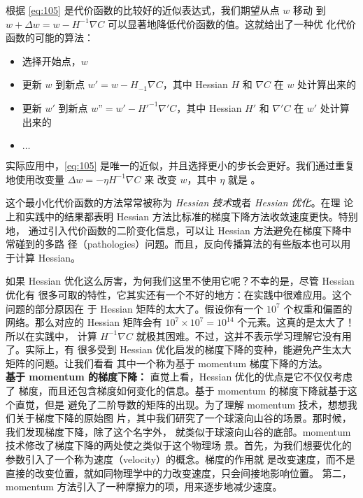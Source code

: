 根据 \eqref{eq:105} 是代价函数的比较好的近似表达式，我们期望从点 $w$ 移动
到 $w+\Delta w = w - H^{-1}\nabla C$ 可以显著地降低代价函数的值。这就给出了一种优
化代价函数的可能的算法：
\begin{itemize}
\item 选择开始点，$w$
\item 更新 $w$ 到新点 $w' = w - H_{-1}\nabla C$，其中 Hessian $H$ 和 $\nabla C$
  在 $w$ 处计算出来的
\item 更新 $w'$ 到新点 $w” = w' - H'^{-1}\nabla' C$，其中 Hessian $H'$ 和
  $\nabla' C$ 在 $w'$ 处计算出来的
\item $\ldots$
\end{itemize}

实际应用中，\eqref{eq:105} 是唯一的近似，并且选择更小的步长会更好。我们通过重复
地使用改变量 $\Delta w = -\eta H^{-1} \nabla C$ 来 改变 $w$，其中 $\eta$ 就是
\learningrate{}。

这个最小化代价函数的方法常常被称为 \emph{Hessian 技术}或者 \emph{Hessian 优化}。在理
论上和实践中的结果都表明 Hessian 方法比标准的梯度下降方法收敛速度更快。特别地，
通过引入代价函数的二阶变化信息，可以让 Hessian 方法避免在梯度下降中常碰到的多路
径（pathologies）问题。而且，反向传播算法的有些版本也可以用于计算 Hessian。

如果 Hessian 优化这么厉害，为何我们这里不使用它呢？不幸的是，尽管 Hessian 优化有
很多可取的特性，它其实还有一个不好的地方：在实践中很难应用。这个问题的部分原因在
于 Hessian 矩阵的太大了。假设你有一个 $10^7$ 个权重和偏置的网络。那么对应的
Hessian 矩阵会有 $10^7 \times 10^7=10^14$ 个元素。这真的是太大了！所以在实践中，
计算 $H^{-1}\nabla C$ 就极其困难。不过，这并不表示学习理解它没有用了。实际上，有
很多受到 Hessian 优化启发的梯度下降的变种，能避免产生太大矩阵的问题。让我们看看
其中一个称为基于 momentum 梯度下降的方法。\\

\textbf{基于 momentum 的梯度下降：} 直觉上看，Hessian 优化的优点是它不仅仅考虑了
梯度，而且还包含梯度如何变化的信息。基于 momentum 的梯度下降就基于这个直觉，但是
避免了二阶导数的矩阵的出现。为了理解 momentum 技术，想想我们关于梯度下降的原始图
片，其中我们研究了一个球滚向山谷的场景。那时候，我们发现梯度下降，除了这个名字外，
就类似于球滚向山谷的底部。momentum 技术修改了梯度下降的两处使之类似于这个物理场
景。首先，为我们想要优化的参数引入了一个称为速度（velocity）的概念。梯度的作用就
是改变速度，而不是直接的改变位置，就如同物理学中的力改变速度，只会间接地影响位置。
第二，momentum 方法引入了一种摩擦力的项，用来逐步地减少速度。

